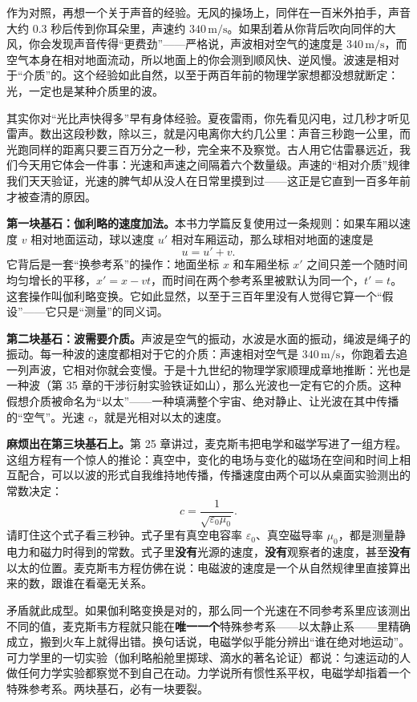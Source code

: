 作为对照，再想一个关于声音的经验。无风的操场上，同伴在一百米外拍手，声音大约 \(0.3\) 秒后传到你耳朵里，声速约 \(340\,\mathrm{m/s}\)。如果刮着从你背后吹向同伴的大风，你会发现声音传得“更费劲”——严格说，声波相对空气的速度是 \(340\,\mathrm{m/s}\)，而空气本身在相对地面流动，所以地面上的你会测到顺风快、逆风慢。波速是相对于“介质”的。这个经验如此自然，以至于两百年前的物理学家想都没想就断定：光，一定也是某种介质里的波。

其实你对“光比声快得多”早有身体经验。夏夜雷雨，你先看见闪电，过几秒才听见雷声。数出这段秒数，除以三，就是闪电离你大约几公里：声音三秒跑一公里，而光跑同样的距离只要三百万分之一秒，完全来不及察觉。古人用它估雷暴远近，我们今天用它体会一件事：光速和声速之间隔着六个数量级。声速的“相对介质”规律我们天天验证，光速的脾气却从没人在日常里摸到过——这正是它直到一百多年前才被查清的原因。


\textbf{第一块基石：伽利略的速度加法。}本书力学篇反复使用过一条规则：如果车厢以速度 \(v\) 相对地面运动，球以速度 \(u'\) 相对车厢运动，那么球相对地面的速度是
\[
u=u'+v.
\]
它背后是一套“换参考系”的操作：地面坐标 \(x\) 和车厢坐标 \(x'\) 之间只差一个随时间均匀增长的平移，\(x'=x-vt\)，而时间在两个参考系里被默认为同一个，\(t'=t\)。这套操作叫伽利略变换。它如此显然，以至于三百年里没有人觉得它算一个“假设”——它只是“测量”的同义词。

\textbf{第二块基石：波需要介质。}声波是空气的振动，水波是水面的振动，绳波是绳子的振动。每一种波的速度都相对于它的介质：声速相对空气是 \(340\,\mathrm{m/s}\)，你跑着去追一列声波，它相对你就会变慢。于是十九世纪的物理学家顺理成章地推断：光也是一种波（第 35 章的干涉衍射实验铁证如山），那么光波也一定有它的介质。这种假想介质被命名为“以太”——一种填满整个宇宙、绝对静止、让光波在其中传播的“空气”。光速 \(c\)，就是光相对以太的速度。

\textbf{麻烦出在第三块基石上。}第 25 章讲过，麦克斯韦把电学和磁学写进了一组方程。这组方程有一个惊人的推论：真空中，变化的电场与变化的磁场在空间和时间上相互配合，可以以波的形式自我维持地传播，传播速度由两个可以从桌面实验测出的常数决定：
\[
c=\frac{1}{\sqrt{\varepsilon_0\mu_0}}.
\]
请盯住这个式子看三秒钟。式子里有真空电容率 \(\varepsilon_0\)、真空磁导率 \(\mu_0\)，都是测量静电力和磁力时得到的常数。式子里\textbf{没有}光源的速度，\textbf{没有}观察者的速度，甚至\textbf{没有}以太的位置。麦克斯韦方程仿佛在说：电磁波的速度是一个从自然规律里直接算出来的数，跟谁在看毫无关系。

矛盾就此成型。如果伽利略变换是对的，那么同一个光速在不同参考系里应该测出不同的值，麦克斯韦方程就只能在\textbf{唯一一个}特殊参考系——以太静止系——里精确成立，搬到火车上就得出错。换句话说，电磁学似乎能分辨出“谁在绝对地运动”。可力学里的一切实验（伽利略船舱里掷球、滴水的著名论证）都说：匀速运动的人做任何力学实验都察觉不到自己在动。力学说所有惯性系平权，电磁学却指着一个特殊参考系。两块基石，必有一块要裂。

